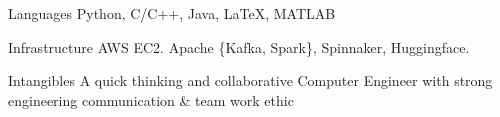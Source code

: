 

\begin{cvskills}

  \cvskill
    {Languages} %
    {Python, C/C++, Java, LaTeX, MATLAB}



  \cvskill
    {Infrastructure} %
    {AWS EC2. Apache \{Kafka, Spark\}, Spinnaker, Huggingface.} %

  \cvskill
    {Intangibles} %
    {A quick thinking and collaborative Computer Engineer with strong engineering communication \& team work ethic} %



\end{cvskills}

